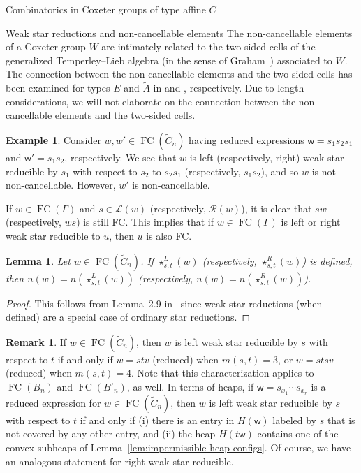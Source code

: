 \documentclass[11pt]{amsart}
\newtheorem{lemma}[theorem]{Lemma}
\theoremstyle{definition}
\newtheorem{example}[theorem]{Example}
\newtheorem{remark}[theorem]{Remark}
\numberwithin{equation}{section}
\newcommand{\C}{\widetilde{C}}
\renewcommand{\L}{\mathcal{L}}
\newcommand{\R}{\mathcal{R}}
\renewcommand{\(}{\left(}
\renewcommand{\)}{\right)}
\newcommand{\w}{\mathsf{w}}
\DeclareMathOperator{\FC}{FC}
\begin{document}
\begin{section}{Combinatorics in Coxeter groups of type affine $C$}
\begin{subsection}{Weak star reductions and non-cancellable elements}
The non-cancellable elements of a Coxeter group $W$ are intimately related to the two-sided cells of the generalized Temperley--Lieb algebra (in the sense of Graham~\cite{Graham1995}) associated to $W$.  The connection between the non-cancellable elements and the two-sided cells has been examined for types $E$ and $\widetilde{A}$ in \cite{Fan1997} and \cite{Fan1999}, respectively.  Due to length considerations, we will not elaborate on the connection between the non-cancellable elements and the two-sided cells.

\begin{example}
Consider $w,w' \in \FC(\C_{n})$ having reduced expressions $\w=s_{1}s_{2}s_{1}$ and $\w'=s_{1}s_{2}$, respectively.  We see that $w$ is left (respectively, right) weak star reducible by $s_{1}$ with respect to $s_{2}$ to $s_2 s_1$ (respectively, $s_1 s_2$), and so $w$ is not non-cancellable.  However, $w'$ is non-cancellable.
\end{example}

If $w\in \FC(\Gamma)$ and $s \in \L(w)$ (respectively, $\R(w)$), it is clear that $sw$ (respectively, $ws$) is still FC.  This implies that if $w \in \FC(\Gamma)$ is left or right weak star reducible to $u$, then $u$ is also FC.

\begin{lemma}\label{lem:weak star ops preserve n-value}
Let $w \in \FC(\C_{n})$.  If $\star^{L}_{s,t}(w)$ (respectively, $\star^{R}_{s,t}(w)$) is defined, then $n(w)=n\left(\star^{L}_{s,t}(w)\right)$ (respectively, $n(w)=n\left(\star^{R}_{s,t}(w)\right)$).
\end{lemma}

\begin{proof}
This follows from Lemma~2.9 in~\cite{Shi2005} since weak star reductions (when defined) are a special case of ordinary star reductions.
\end{proof}

\begin{remark}\label{rem:wsrm properties}
If $w \in \FC(\C_{n})$, then $w$ is left weak star reducible by $s$ with respect to $t$ if and only if $w=stv$ (reduced) when $m(s,t)=3$, or $w=stsv$ (reduced) when $m(s,t)=4$.   Note that this characterization applies to $\FC(B_{n})$ and $\FC(B'_{n})$, as well.  In terms of heaps, if $\w=s_{x_1}\cdots s_{x_r}$ is a reduced expression for $w \in \FC(\C_{n})$, then $w$ is left weak star reducible by $s$ with respect to $t$ if and only if (i) there is an entry in $H(\w)$ labeled by $s$ that is not covered by any other entry, and (ii) the heap $H(t\w)$ contains one of the convex subheaps of Lemma~\ref{lem:impermissible heap configs}.  Of course, we have an analogous statement for right weak star reducible.
\end{remark}


\end{subsection}
\end{section}
\end{document}
